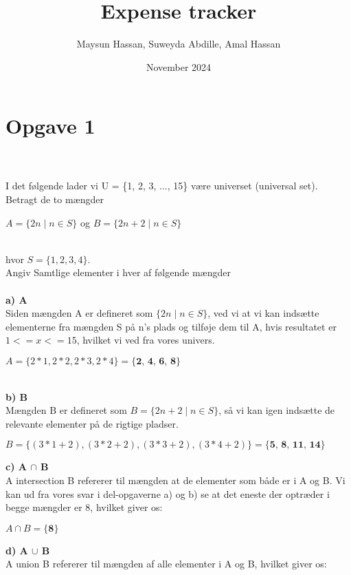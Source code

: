 \documentclass{article}
\title{Expense tracker}
\author{Maysun Hassan, Suweyda Abdille, Amal Hassan}
\date{November 2024}
\begin{document}


\tableofcontents
\thispagestyle{empty}
\newpage
\setcounter{page}{1}
 

\section*{Opgave 1}

\\
\\
I det følgende lader vi U = \{1, 2, 3, ..., 15\} være universet (universal set).
\\
Betragt de to mængder
\begin{center}
    \( A = \{ 2n \mid n \in S \} \) og \( B = \{ 2n + 2 \mid n \in S \} \)
\end{center}
\\
hvor \(S = \{1, 2, 3, 4\}.\)
\\
Angiv Samtlige elementer i hver af følgende mængder
\\
\\
\textbf{a) A}\\
Siden mængden A er defineret som \(\{ 2n \mid n \in S \}\), ved vi at vi kan indsætte elementerne fra mængden S på n's plads og tilføje dem til A, hvis resultatet er \(1 <= x <= 15\), hvilket vi ved fra vores univers.
\begin{center}
\(A = \{2*1, 2*2, 2*3, 2*4\} = \textbf{\{2, 4, 6, 8\}}\) \\
\end{center}
\\
\textbf{b) B}\\
Mængden B er defineret som \(B = \{2n + 2 \mid n \in S\}\), så vi kan igen indsætte de relevante elementer på de rigtige pladser. 
\begin{center}
    \(B = \{(3*1+2), (3*2+2), (3*3+2), (3*4+2)\} = \textbf{\{5, 8, 11, 14\}}\)
\end{center}
\textbf{c) A \(\cap\) B}\\
A intersection B refererer til mængden at de elementer som både er i A og B. Vi kan ud fra vores svar i del-opgaverne a) og b) se at det eneste der optræder i begge mængder er 8, hvilket giver os: 
\begin{center}
    \(A \cap B = \textbf{\{8\}}\) \\
\end{center}
\textbf{d) A \(\cup\) B}\\
A union B refererer til mængden af alle elementer i A og B, hvilket giver os: 
\end{document}
